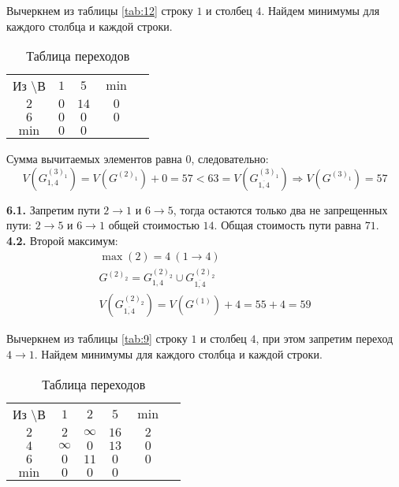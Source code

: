 Вычеркнем из таблицы \ref{tab:12} строку $1$ и столбец $4$. Найдем минимумы для каждого столбца и каждой строки.

\begin{table}[H]
\begin{center}
	\def\tabcolsep{15pt}
	\caption{Таблица переходов}
	\label{tab:14}
	\begin{tabular}{|c||c|c|c|c|}
		\hline
		Из \textbackslash В & $1$ & $5$ & $\min$ \\
		\hhline{|=#=|=|=|}
		$2$ & $0$ & $14$ & $0$ \\
		\hline
		$6$ & $0$ &$0$ & $0$ \\
		\hhline{|=#=|=|=|}
		$\min$ & $0$ & $0$ & \\ 
		\hline
	\end{tabular}
\end{center}
\end{table}

Сумма вычитаемых элементов равна $0$, следовательно:
\begin{equation*}
V(G_{1,4}^{(3)_1}) = V(G^{(2)_1}) + 0 = 57 < 63 = V(G_{\overline{1,4}}^{(3)_1}) \Rightarrow V(G^{(3)_1}) = 57
\end{equation*}

\textbf{6.1.} Запретим пути $2 \rightarrow 1$ и $6 \rightarrow 5$, тогда остаются только два не запрещенных пути: $2 \rightarrow 5$ и $6 \rightarrow 1$ общей стоимостью $14$. Общая стоимость пути равна $71$. \\

\textbf{4.2.} Второй максимум:
\begin{gather*}
\max(2) = 4\ (1 \rightarrow 4) \\
G^{(2)_2} = G_{1,4}^{(2)_2} \cup G_{\overline{1,4}}^{(2)_2} \\
V(G_{\overline{1,4}}^{(2)_2}) = V(G^{(1)}) + 4 = 55 + 4 = 59
\end{gather*}

Вычеркнем из таблицы \ref{tab:9} строку $1$ и столбец $4$, при этом запретим переход $4 \rightarrow 1$. Найдем минимумы для каждого столбца и каждой строки.

\begin{table}[H]
\begin{center}
	\def\tabcolsep{15pt}
	\caption{Таблица переходов}
	\label{tab:15}
	\begin{tabular}{|c||c|c|c|c|c|}
		\hline
		Из \textbackslash В & $1$ & $2$& $5$ & $\min$ \\
		\hhline{|=#=|=|=|=|}
		$2$ & $2$ & $\infty$ & $16$ & $2$ \\
		\hline
		$4$ & $\infty$ & $0$ & $13$ & $0$ \\
		\hline
		$6$ & $0$ & $11$ & $0$ & $0$ \\
		\hhline{|=#=|=|=|=|}
		$\min$ & $0$ & $0$ & $0$ & \\ 
		\hline
	\end{tabular}
\end{center}
\end{table}

